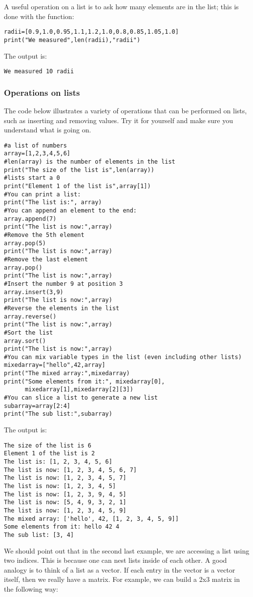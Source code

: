 A useful operation on a list is to ask how many elements are in the list; this is done with the  function:
\begin{lstlisting}[frame=single] 
radii=[0.9,1.0,0.95,1.1,1.2,1.0,0.8,0.85,1.05,1.0]
print("We measured",len(radii),"radii")
\end{lstlisting}
The output is:
\begin{verbatim}
We measured 10 radii
\end{verbatim}

\subsubsection{Operations on lists}
The code below illustrates a variety of operations that can be performed on lists, such as inserting and removing values. Try it for yourself and make sure you understand what is going on.
\begin{lstlisting}[frame=single] 
#a list of numbers
array=[1,2,3,4,5,6]
#len(array) is the number of elements in the list
print("The size of the list is",len(array))
#lists start a 0
print("Element 1 of the list is",array[1])
#You can print a list:
print("The list is:", array)
#You can append an element to the end:
array.append(7)
print("The list is now:",array)
#Remove the 5th element
array.pop(5)
print("The list is now:",array)
#Remove the last element
array.pop()
print("The list is now:",array)
#Insert the number 9 at position 3
array.insert(3,9)
print("The list is now:",array)
#Reverse the elements in the list
array.reverse()
print("The list is now:",array)
#Sort the list
array.sort()
print("The list is now:",array)
#You can mix variable types in the list (even including other lists)
mixedarray=["hello",42,array]
print("The mixed array:",mixedarray)
print("Some elements from it:", mixedarray[0],
      mixedarray[1],mixedarray[2][3])
#You can slice a list to generate a new list
subarray=array[2:4]
print("The sub list:",subarray)
\end{lstlisting}
The output is:
\begin{verbatim}
The size of the list is 6
Element 1 of the list is 2
The list is: [1, 2, 3, 4, 5, 6]
The list is now: [1, 2, 3, 4, 5, 6, 7]
The list is now: [1, 2, 3, 4, 5, 7]
The list is now: [1, 2, 3, 4, 5]
The list is now: [1, 2, 3, 9, 4, 5]
The list is now: [5, 4, 9, 3, 2, 1]
The list is now: [1, 2, 3, 4, 5, 9]
The mixed array: ['hello', 42, [1, 2, 3, 4, 5, 9]]
Some elements from it: hello 42 4
The sub list: [3, 4]
\end{verbatim}
We should point out that in the second last example, we are accessing a list using two indices. This is because one can nest lists inside of each other. A good analogy is to think of a list as a vector. If each entry in the vector is a vector itself, then we really have a matrix. For example, we can build a 2x3 matrix in the following way:
